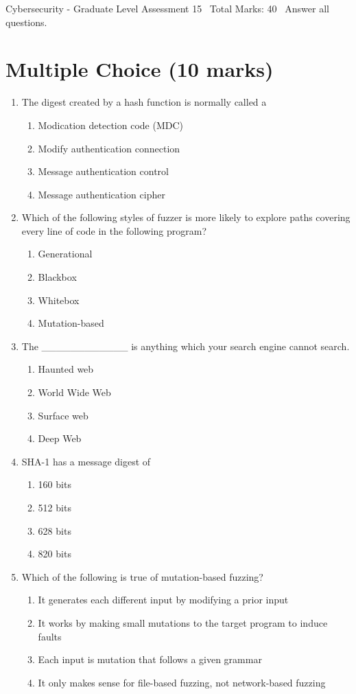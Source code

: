 \documentclass[12pt]{article}
\begin{document}
\begin{center}
Cybersecurity - Graduate Level Assessment 15 \
Total Marks: 40 \
Answer all questions.
\end{center}

\section*{Multiple Choice (10 marks)}
\begin{enumerate}[label=\arabic*.]
\item The digest created by a hash function is normally called a
\begin{enumerate}[label=(\alph*)]
    \item Modication detection code (MDC)
    \item Modify authentication connection
    \item Message authentication control
    \item Message authentication cipher
\end{enumerate}
\item Which of the following styles of fuzzer is more likely to explore paths covering every line of code in the following program?
\begin{enumerate}[label=(\alph*)]
    \item Generational
    \item Blackbox
    \item Whitebox
    \item Mutation-based
\end{enumerate}
\item The \_\_\_\_\_\_\_\_\_\_\_\_ is anything which your search engine cannot search.
\begin{enumerate}[label=(\alph*)]
    \item Haunted web
    \item World Wide Web
    \item Surface web
    \item Deep Web
\end{enumerate}
\item SHA-1 has a message digest of
\begin{enumerate}[label=(\alph*)]
    \item 160 bits
    \item 512 bits
    \item 628 bits
    \item 820 bits
\end{enumerate}
\item Which of the following is true of mutation-based fuzzing?
\begin{enumerate}[label=(\alph*)]
    \item It generates each different input by modifying a prior input
    \item It works by making small mutations to the target program to induce faults
    \item Each input is mutation that follows a given grammar
    \item It only makes sense for file-based fuzzing, not network-based fuzzing
\end{enumerate}
\end{enumerate}
\end{document}
